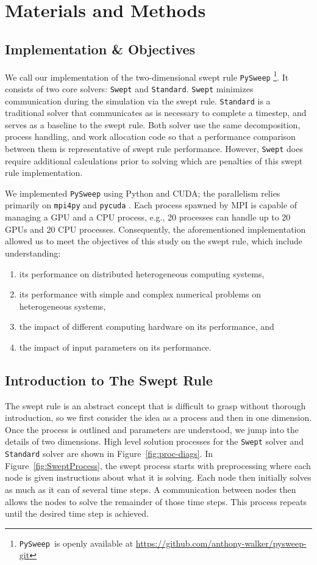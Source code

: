 \documentclass[mca,article,submit,moreauthors,pdftex]{Definitions/mdpi}
\def\github{\url{https://github.com/anthony-walker/pysweep-git}}
\def\pysweep{\texttt{PySweep}}
\def\Swept{\texttt{Swept}}
\def\Standard{\texttt{Standard}}
\begin{document}
\section{Materials and Methods}
\label{methods-section}

\subsection{Implementation \& Objectives}

We call our implementation of the two-dimensional swept rule \pysweep{} \footnote{\pysweep~is openly available at \github}. It consists of two core solvers: \Swept{} and \Standard{}. \Swept{} minimizes communication during the simulation via the swept rule. \Standard{} is a traditional solver that communicates as is necessary to complete a timestep, and serves as a baseline to the swept rule. Both solver use the same decomposition, process handling, and work allocation code so that a performance comparison between them is representative of swept rule performance. However, \Swept{} does require additional calculations prior to solving which are penalties of this swept rule implementation. 

We implemented \pysweep{} using Python and CUDA; the parallelism relies primarily on \texttt{mpi4py} \cite{dalcin_mpi_2005} and \texttt{pycuda} \cite{klockner_pycuda_2012}. Each process spawned by MPI is capable of managing a GPU and a CPU process, e.g., 20 processes can handle up to 20 GPUs and 20 CPU processes. Consequently, the aforementioned implementation allowed us to meet the objectives of this study on the swept rule, which include understanding:
\begin{enumerate}
    \item its performance on distributed heterogeneous computing systems,
    \item its performance with simple and complex numerical problems on heterogeneous systems,
    \item the impact of different computing hardware on its performance, and
    \item the impact of input parameters on its performance.
\end{enumerate}

\subsection{Introduction to The Swept Rule}
The swept rule is an abstract concept that is difficult to grasp without thorough introduction, so we first consider the idea as a process and then in one dimension. Once the process is outlined and parameters are understood, we jump into the details of two dimensions. High level solution processes for the \Swept{} solver and \Standard{} solver are shown in  Figure~\ref{fig:proc-diags}. In Figure~\ref{fig:SweptProcess}, the swept process starts with preprocessing where each node is given instructions about what it is solving. Each node then initially solves as much as it can of several time steps. A communication between nodes then allows the nodes to solve the remainder of those time steps. This process repeats until the desired time step is achieved. 
\end{document}
